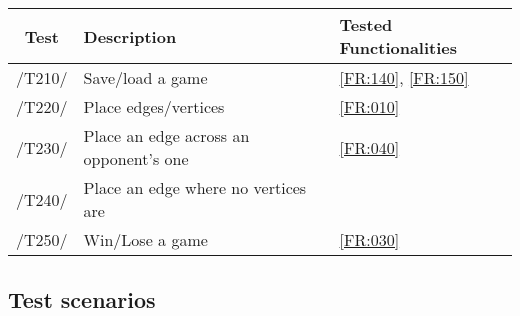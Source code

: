 \begin{tabular}{cll}

\hline
{\bf Test} & {\bf Description} & {\bf Tested Functionalities} \\
\hline
/T210/ & Save/load a game & \ref{FR:140}, \ref{FR:150} \\
/T220/ & Place edges/vertices & \ref{FR:010} \\
/T230/ & Place an edge across an opponent's one & \ref{FR:040} \\
/T240/ & Place an edge where no vertices are & \\
/T250/ & Win/Lose a game & \ref{FR:030}\\
\hline

\end{tabular}

\subsection{Test scenarios}


